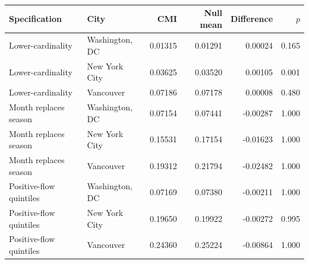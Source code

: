 \begin{table}[!htbp]
\caption{}
\label{tab:sup_revision_robustness}
\raggedleft
\color{red}
\setlength{\tabcolsep}{3.5pt}
\begin{tabular*}{\textwidth}{@{\extracolsep{\fill}}llrrrr@{}}
\toprule
\textbf{Specification} & \textbf{City} & \textbf{CMI} & \textbf{Null mean} & \textbf{Difference} & \textbf{$p$}\\
\midrule
Lower-cardinality & Washington, DC & 0.01315 & 0.01291 & 0.00024 & 0.165\\
Lower-cardinality & New York City & 0.03625 & 0.03520 & 0.00105 & 0.001\\
Lower-cardinality & Vancouver & 0.07186 & 0.07178 & 0.00008 & 0.480\\
Month replaces season & Washington, DC & 0.07154 & 0.07441 & -0.00287 & 1.000\\
Month replaces season & New York City & 0.15531 & 0.17154 & -0.01623 & 1.000\\
Month replaces season & Vancouver & 0.19312 & 0.21794 & -0.02482 & 1.000\\
Positive-flow quintiles & Washington, DC & 0.07169 & 0.07380 & -0.00211 & 1.000\\
Positive-flow quintiles & New York City & 0.19650 & 0.19922 & -0.00272 & 0.995\\
Positive-flow quintiles & Vancouver & 0.24360 & 0.25224 & -0.00864 & 1.000\\
\bottomrule
\end{tabular*}
\end{table}

